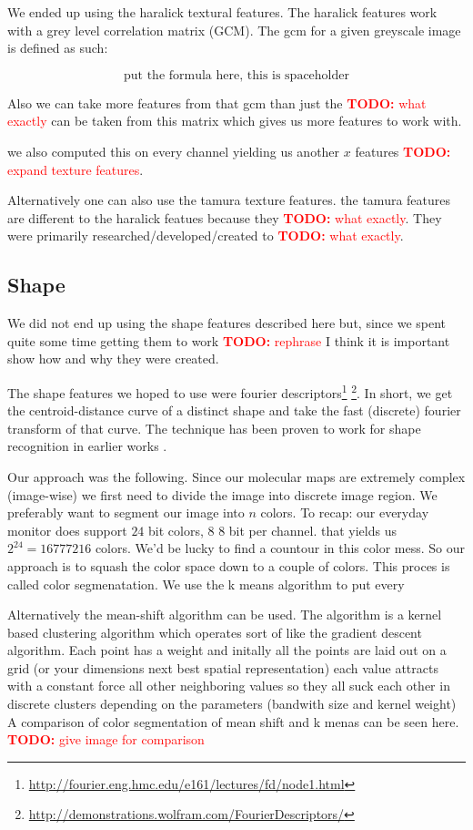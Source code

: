 \documentclass[journal]{vgtc}       %
\newcommand{\todo}[1]{\textcolor{red}{\textbf{TODO:} #1}}
\begin{document}
We ended up using the haralick textural features. The haralick features work with a grey level correlation matrix (GCM). The gcm for a given greyscale image is defined as such:

\[\text{put the formula here, this is spaceholder}\]

Also we can take more features from that gcm than just the \todo{what exactly} can be taken from this matrix which gives us more features to work with.

we also computed this on every channel yielding us another \(x\) features \todo{expand texture features}.

Alternatively one can also use the tamura texture features. the tamura features are different to the haralick featues because they \todo{what exactly}.
They were primarily researched/developed/created to \todo{what exactly}. 	

\subsection{Shape}
We did not end up using the shape features described here but, since we spent quite some time getting them to work \todo{rephrase} I think it is important show how and why they were created.

The shape features we hoped to use were  fourier descriptors\footnote{\url{http://fourier.eng.hmc.edu/e161/lectures/fd/node1.html} } \footnote{\url{http://demonstrations.wolfram.com/FourierDescriptors/}}. In short, we get the centroid-distance curve of a distinct shape and take the fast (discrete) fourier transform of that curve. The technique has been proven to work for shape recognition  in earlier works \cite{fourierd}.

Our approach was the following.  Since our molecular maps are extremely complex (image-wise) we first need to divide the image into discrete image region.  We preferably want to segment our image into $n$ colors. To recap: our everyday monitor does support \(24\) bit colors, \(8 \) 8 bit per channel. that yields us \(2^{24}=16777216 \) colors.
We'd be lucky to find a countour in this color mess.
So our approach is to squash the color space down to a couple of colors.
This proces is called color segmenatation. We use the k means algorithm to put every 

Alternatively the mean-shift algorithm can be used. The algorithm is a kernel based clustering algorithm which operates sort of like the gradient descent algorithm.
Each point has a weight and initally all the points are laid out on a grid (or your dimensions next best spatial representation) each value attracts with a constant force all other neighboring values so they all suck each other in discrete clusters depending on the parameters (bandwith size and kernel weight) A comparison of color segmentation of mean shift and  k menas can be seen here. \todo{give image for comparison}
\end{document}

